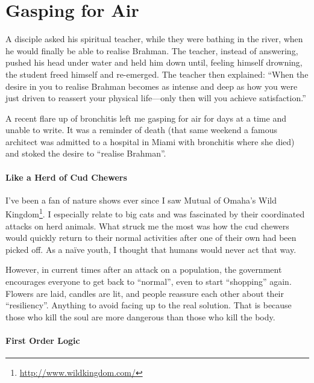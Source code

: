\section{Gasping for Air}

\begin{quotex}
A disciple asked his spiritual teacher, while they were bathing in the river, when he would finally be able to realise Brahman. The teacher, instead of answering, pushed his head under water and held him down until, feeling himself drowning, the student freed himself and re-emerged. The teacher then explained: ``When the desire in you to realise Brahman becomes as intense and deep as how you were just driven to reassert your physical life---only then will you achieve satisfaction.'' 
\end{quotex}


A recent flare up of bronchitis left me gasping for air for days at a time and unable to write. It was a reminder of death (that same weekend a famous architect was admitted to a hospital in Miami with bronchitis where she died) and stoked the desire to ``realise Brahman''.

\paragraph{Like a Herd of Cud Chewers}


I've been a fan of nature shows ever since I saw Mutual of Omaha's Wild Kingdom\footnote{\url{http://www.wildkingdom.com/}}. I especially relate to big cats and was fascinated by their coordinated attacks on herd animals. What struck me the most was how the cud chewers would quickly return to their normal activities after one of their own had been picked off. As a naïve youth, I thought that humans would never act that way.

However, in current times after an attack on a population, the government encourages everyone to get back to ``normal'', even to start ``shopping'' again. Flowers are laid, candles are lit, and people reassure each other about their ``resiliency''. Anything to avoid facing up to the real solution. That is because those who kill the soul are more dangerous than those who kill the body.

\paragraph{First Order Logic}


